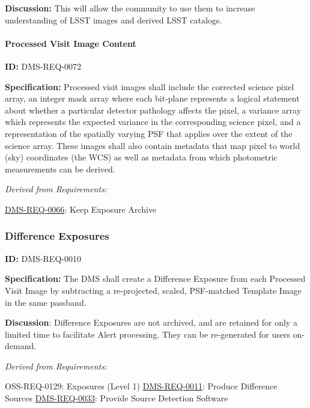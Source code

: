 \documentclass[SE,toc,lsstdraft]{lsstdoc}
\begin{document}
\textbf{Discussion:} This will allow the community to use them to increase understanding of LSST images and derived LSST catalogs.




\paragraph{Processed Visit Image Content}\hfill  %

\label{DMS-REQ-0072}
\textbf{ID:} DMS-REQ-0072

\textbf{Specification:} Processed visit images shall include the corrected science pixel array, an integer mask array where each bit-plane represents a logical statement about whether a particular detector pathology affects the pixel, a variance array which represents the expected variance in the corresponding science pixel, and a representation of the spatially varying PSF that applies over the extent of the science array. These images shall also contain metadata that map pixel to world (sky) coordinates (the WCS) as well as metadata from which photometric measurements can be derived.






\emph{Derived from Requirements:}

\hyperref[DMS-REQ-0066]{DMS-REQ-0066}:
Keep Exposure Archive \newline


\subsubsection{Difference Exposures}

\label{DMS-REQ-0010}
\textbf{ID:} DMS-REQ-0010

\textbf{Specification:} The DMS shall create a Difference Exposure from each Processed Visit Image by subtracting a re-projected, scaled, PSF-matched Template Image in the same passband.

\textbf{Discussion}: Difference Exposures are not archived, and are retained for only a limited time to facilitate Alert processing. They can be re-generated for users on-demand.




\emph{Derived from Requirements:}

OSS-REQ-0129:
Exposures (Level 1) \newline
\hyperref[DMS-REQ-0011]{DMS-REQ-0011}:
Produce Difference Sources \newline
\hyperref[DMS-REQ-0033]{DMS-REQ-0033}:
Provide Source Detection Software \newline
\end{document}
